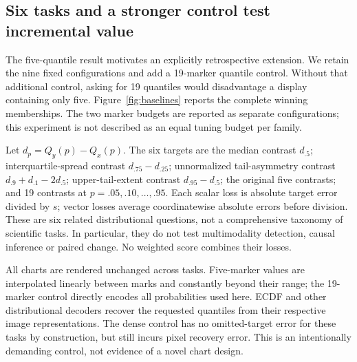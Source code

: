 \documentclass[11pt]{article}
\begin{document}
\begin{table}[ht]\centering\small
\caption{\textbf{Reference results across 127 comparisons.} ``Wins'' permits all 23 settings; ``Fixed wins'' permits one setting per family. Median $S$ and group error $G$ use each family's best valid reference setting. Failed settings are excluded from selection, not assigned favorable values.}\label{tab:results}

\end{table}

\subsection*{Six tasks and a stronger control test incremental value}
The five-quantile result motivates an explicitly retrospective extension. We retain the nine fixed configurations and add a 19-marker quantile control. Without that additional control, asking for 19 quantiles would disadvantage a display containing only five. Figure~\ref{fig:baselines} reports the complete winning memberships. The two marker budgets are reported as separate configurations; this experiment is not described as an equal tuning budget per family.

Let $d_p=Q_y(p)-Q_x(p)$. The six targets are the median contrast $d_{.5}$; interquartile-spread contrast $d_{.75}-d_{.25}$; unnormalized tail-asymmetry contrast $d_{.9}+d_{.1}-2d_{.5}$; upper-tail-extent contrast $d_{.95}-d_{.5}$; the original five contrasts; and 19 contrasts at $p=.05,.10,\ldots,.95$. Each scalar loss is absolute target error divided by $s$; vector losses average coordinatewise absolute errors before division. These are six related distributional questions, not a comprehensive taxonomy of scientific tasks. In particular, they do not test multimodality detection, causal inference or paired change. No weighted score combines their losses.

All charts are rendered unchanged across tasks. Five-marker values are interpolated linearly between marks and constantly beyond their range; the 19-marker control directly encodes all probabilities used here. ECDF and other distributional decoders recover the requested quantiles from their respective image representations. The dense control has no omitted-target error for these tasks by construction, but still incurs pixel recovery error. This is an intentionally demanding control, not evidence of a novel chart design.
\end{document}
